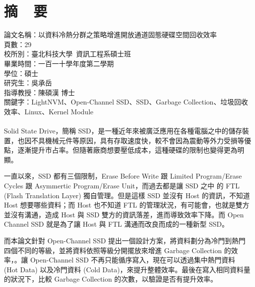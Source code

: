 \chapter*{摘~~要}


\noindent
論文名稱：以資料冷熱分群之策略增進開放通道固態硬碟空間回收效率 \\%
頁數：29\\
校所別：臺北科技大學~資訊工程系碩士班\\
畢業時間：一百一十學年度第二學期\\
學位：碩士\\
研究生：吳承岳\\
指導教授：陳碩漢 博士\\
\noindent
關鍵字：LightNVM、Open-Channel SSD、SSD、Garbage Collection、垃圾回收效率、Linux、Kernel Module\\
\hspace*{\fill}\\
%
\indent
Solid State Drive，簡稱 SSD，是一種近年來被廣泛應用在各種電腦之中的儲存裝置，也因不具機械元件等原因，具有存取速度快，較不會因為震動等外力受損等優點，逐漸提升市占率。但隨著廠商想要壓低成本，這種硬碟的限制也變得更為明顯。

一直以來，SSD 都有三個限制，Erase Before Write 跟 Limited Program/Erase Cycles 跟 Asymmertic Program/Erase Unit，而過去都是讓 SSD 之中 的 FTL (Flash Translation Layer) 獨自管理。但是這樣 SSD 並沒有 Host 的資訊，不知道 Host 想要哪些資料；而 Host 也不知道 FTL 的管理狀況，有可能會，也就是雙方並沒有溝通，造成 Host 與 SSD 雙方的資訊落差，進而導致效率下降。而 Open Channel SSD 就是為了讓 Host 與 FTL 溝通而改良而成的一種新型 SSD。

\indent
而本論文針對 Open-Channel SSD 提出一個設計方案，將資料劃分為冷門到熱門四個不同的等級，並將資料依照等級分開擺放來增進 Garbage Collection 的效率，。讓 Open-Channel SSD 不再只能循序寫入，現在可以透過集中熱門資料 (Hot Data) 以及冷門資料 (Cold Data)，來提升整體效率。最後在寫入相同資料量的狀況下，比較 Garbage Collection 的次數，以驗證是否有提升效率。


